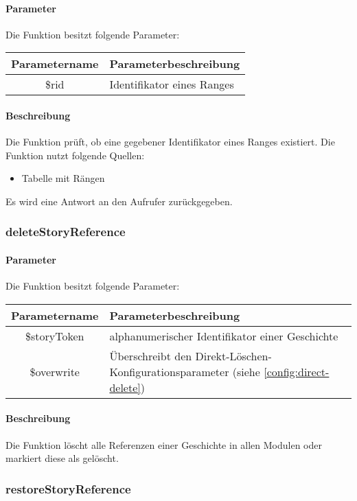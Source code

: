 \paragraph{Parameter} Die Funktion besitzt folgende Parameter:
\begin{table}[H]
	\begin{tabular}{|c|p{11cm}|}
		\hline
		\textbf{Parametername} & \textbf{Parameterbeschreibung} \\ \hline
		\$rid & Identifikator eines Ranges \\ \hline
	\end{tabular}
\end{table}
\paragraph{Beschreibung} Die Funktion prüft, ob eine gegebener Identifikator eines Ranges existiert. Die Funktion nutzt folgende Quellen:
\begin{itemize}
	\item Tabelle mit Rängen
\end{itemize}
Es wird eine Antwort an den Aufrufer zurückgegeben.
\subsubsection{deleteStoryReference}
\paragraph{Parameter} Die Funktion besitzt folgende Parameter:
\begin{table}[H]
	\begin{tabular}{|c|p{11cm}|}
		\hline
		\textbf{Parametername} & \textbf{Parameterbeschreibung} \\ \hline
		\$storyToken & alphanumerischer Identifikator einer Geschichte \\ \hline
		\$overwrite  & Überschreibt den Direkt-Löschen-Konfigurationsparameter (siehe \autoref{config:direct-delete}) \\ \hline
	\end{tabular}
\end{table}
\paragraph{Beschreibung} Die Funktion löscht alle Referenzen einer Geschichte in allen Modulen oder markiert diese als gelöscht.
\subsubsection{restoreStoryReference}
